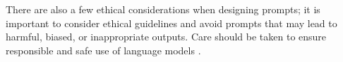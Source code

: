 There are also a few ethical considerations when designing prompts; it is important to consider ethical guidelines and avoid prompts that may lead to harmful, biased, or inappropriate outputs. Care should be taken to ensure responsible and safe use of language models \cite{li2023ethics,kasneci2023chatgpt}. 
